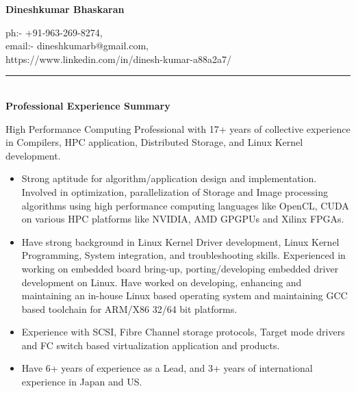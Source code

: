 \documentclass[a4paper,10pt]{memoir} %
\newcommand{\userinformation}[1]{\renewcommand{\userinformation}{#1}} %
\newcommand{\cvheading}[1]{{\Huge\bfseries\color{RoyalBlue} #1} \par\vspace{.6\baselineskip}} %
\newcommand{\SmallSep}{\vspace{0.5em}} %
\newcommand{\CVSection}[1]{ %
{\Large\textbf{#1}}\par
\SmallSep %
}
\begin{document}

\begin{center}
\cvheading{Dineshkumar Bhaskaran} %
\end{center}

\begin{flushright}
\begin{small}
ph:- +91-963-269-8274, \\
email:- dineshkumarb@gmail.com,\\
https://www.linkedin.com/in/dinesh-kumar-a88a2a7/
\end{small}
\end{flushright}         
\rule{\textwidth}{1pt}
\\

\CVSection{Professional Experience Summary}{}
	High Performance Computing Professional with 17+ years of collective experience in Compilers, HPC application, Distributed Storage, and Linux Kernel development.
\begin{itemize} 
	\item Strong aptitude for algorithm/application design and implementation. Involved in optimization, parallelization of Storage and Image processing algorithms using high performance computing languages like OpenCL, CUDA on various HPC platforms like NVIDIA, AMD GPGPUs and Xilinx FPGAs.
	\item Have strong background in Linux Kernel Driver development, Linux Kernel Programming, System integration, and troubleshooting skills. Experienced in working on embedded board bring-up, porting/developing embedded driver development on Linux. Have worked on developing, enhancing and maintaining an in-house Linux based operating system and maintaining GCC based toolchain for ARM/X86 32/64 bit platforms.
	\item Experience with SCSI, Fibre Channel storage protocols, Target mode drivers and FC switch based virtualization application and products. 
	\item Have 6+ years of experience as a Lead, and 3+ years of international experience in Japan and US.
	
\end{itemize}
\end{document}
